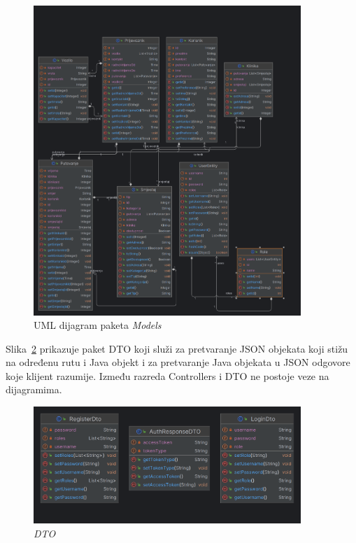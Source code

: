 			\begin{figure}[htbp]
				\centering
				\includegraphics[width=0.9\textwidth]{slike/models}
				\caption{UML dijagram paketa \textit{Models}}
				\label{fig:models}
			\end{figure}
			
			\eject
			
			Slika~\ref{fig:dto} prikazuje paket DTO koji služi za pretvaranje JSON objekata koji stižu na određenu rutu i Java objekt i za pretvaranje Java objekata u JSON odgovore koje klijent razumije.
			Između razreda Controllers i DTO ne postoje veze na dijagramima.
			
			\begin{figure}[htbp]
				\centering
				\includegraphics[width=0.9\textwidth]{slike/dto}
				\caption{\textit{DTO}}
				\label{fig:dto}
			\end{figure}
			
